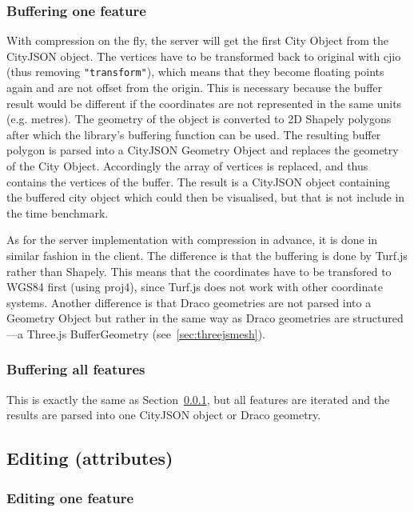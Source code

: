 \subsubsection{Buffering one feature}
\label{sec:implbufferone}

With compression on the fly, the server will get the first City Object from the CityJSON object.
The vertices have to be transformed back to original with cjio (thus removing \texttt{"transform"}), which means that they become floating points again and are not offset from the origin.
This is necessary because the buffer result would be different if the coordinates are not represented in the same units (e.g. metres).
The geometry of the object is converted to 2D Shapely polygons after which the library's buffering function can be used.
The resulting buffer polygon is parsed into a CityJSON Geometry Object and replaces the geometry of the City Object.
Accordingly the array of vertices is replaced, and thus contains the vertices of the buffer.
The result is a CityJSON object containing the buffered city object which could then be visualised, but that is not include in the time benchmark.

As for the server implementation with compression in advance, it is done in similar fashion in the client.
The difference is that the buffering is done by Turf.js rather than Shapely.
This means that the coordinates have to be transfored to WGS84 first (using proj4), since Turf.js does not work with other coordinate systems.
Another difference is that Draco geometries are not parsed into a Geometry Object but rather in the same way as Draco geometries are structured---a Three.js BufferGeometry (see~\ref{sec:threejsmesh}).

\subsubsection{Buffering all features}
\label{sec:implbufferall}

This is exactly the same as Section~\ref{sec:implbufferone}, but all features are iterated and the results are parsed into one CityJSON object or Draco geometry.




\subsection{Editing (attributes)}
\subsubsection{Editing one feature}
\label{sec:impleditone}

